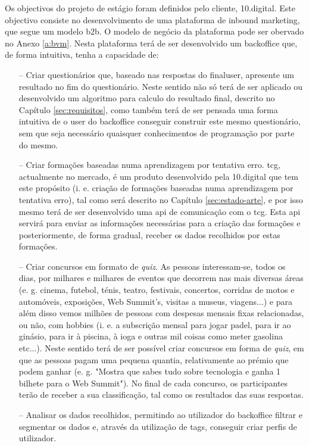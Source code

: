 Os objectivos do projeto de estágio foram definidos pelo cliente, 10.digital. Este objectivo consiste no desenvolvimento de uma plataforma de inbound marketing, que segue um modelo \gls{b2b}. O modelo de negócio da plataforma pode ser obervado no Anexo \ref{a:bvm}. Nesta plataforma terá de ser desenvolvido um \gls{backoffice} que, de forma intuitiva, tenha a capacidade de:
\begin{itemize}
	\item[--] Criar questionários que, baseado nas respostas do \gls{finaluser}, apresente um resultado no fim do questionário. Neste sentido não só terá de ser aplicado ou desenvolvido um algoritmo para calculo do resultado final, descrito no Capítulo \ref{sec:requisitos}, como também terá de ser pensada uma forma intuitiva de o \gls{user} do \gls{backoffice} conseguir construir este mesmo questionário, sem que seja necessário quaisquer conhecimentos de programação por parte do mesmo.
	\item[--] Criar formações baseadas numa aprendizagem por tentativa erro. \acrfull{tcg}\cite{tcg}, actualmente no mercado, é um produto desenvolvido pela 10.digital que tem este propósito (i. e. criação de formações baseadas numa aprendizagem por tentativa erro), tal como será descrito no Capítulo \ref{sec:estado-arte}, e por isso mesmo terá de ser desenvolvido uma \acrshort{api} de comunicação com o \acrshort{tcg}. Esta \acrshort{api} servirá para enviar as informações necessárias para a criação das formações e posteriormente, de forma gradual, receber os dados recolhidos por estas formações. 
	\item[--] Criar concursos em formato de \textit{quiz}. As pessoas interessam-se, todos os dias, por milhares e milhares de eventos que decorrem nas mais diversas áreas (e. g. 	cinema, futebol, ténis, teatro, festivais, concertos, corridas de motos e automóveis, exposições, Web Summit's\cite{websummit}, visitas a museus, viagens...) e para além disso
	vemos milhões de pessoas com despesas mensais fixas relacionadas, ou não, com hobbies (i. e. a subscrição mensal para jogar padel, para ir ao ginásio, para ir à piscina, à ioga e outras mil coisas como meter gasolina etc...). Neste sentido terá de ser possível criar concursos em forma de \textit{quiz}, em que as pessoas pagam uma pequena quantia, relativamente ao prémio que podem ganhar (e. g. "Mostra que sabes tudo sobre tecnologia e ganha 1 bilhete para o Web Summit"). No final de cada concurso, os participantes terão de receber a sua classificação, tal como os resultados das suas respostas.
	\item[--] Analisar os dados recolhidos, permitindo ao utilizador do \gls{backoffice} filtrar e segmentar os dados e, através da utilização de \gls{tags}, conseguir criar perfis de utilizador.
\end{itemize}



